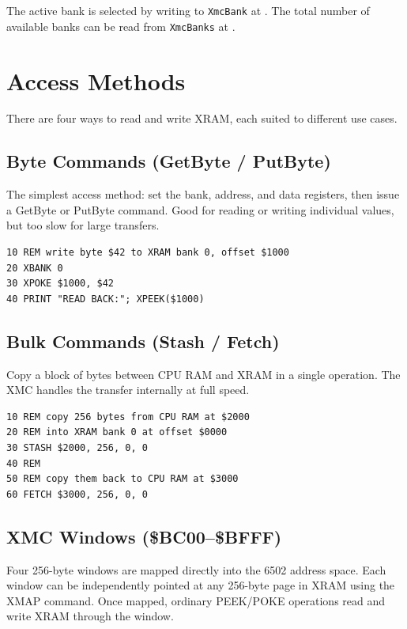 The active bank is selected by writing to \texttt{XmcBank} at .
The total number of available banks can be read from \texttt{XmcBanks} at
.


\section{Access Methods}
\label{sec:xram-access}

There are four ways to read and write XRAM, each suited to different use cases.

\subsection{Byte Commands (GetByte / PutByte)}

The simplest access method: set the bank, address, and data registers, then
issue a GetByte or PutByte command.  Good for reading or writing individual
values, but too slow for large transfers.

\begin{lstlisting}
10 REM write byte $42 to XRAM bank 0, offset $1000
20 XBANK 0
30 XPOKE $1000, $42
40 PRINT "READ BACK:"; XPEEK($1000)
\end{lstlisting}

\subsection{Bulk Commands (Stash / Fetch)}

Copy a block of bytes between CPU RAM and XRAM in a single operation.  The XMC
handles the transfer internally at full speed.

\begin{lstlisting}
10 REM copy 256 bytes from CPU RAM at $2000
20 REM into XRAM bank 0 at offset $0000
30 STASH $2000, 256, 0, 0
40 REM
50 REM copy them back to CPU RAM at $3000
60 FETCH $3000, 256, 0, 0
\end{lstlisting}

\subsection{XMC Windows (\$BC00--\$BFFF)}

Four 256-byte windows are mapped directly into the 6502 address space.  Each
window can be independently pointed at any 256-byte page in XRAM using the
XMAP command.  Once mapped, ordinary PEEK/POKE operations read and write XRAM
through the window.

